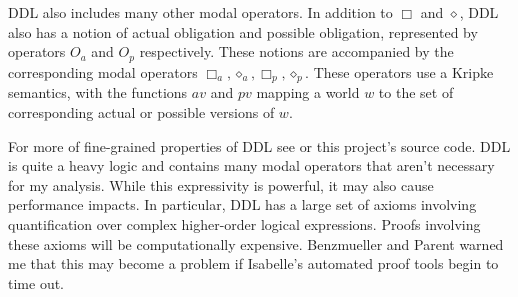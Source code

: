 \begin{isabellebody}
\begin{isamarkuptext}
DDL also includes many other modal operators. In addition to $\Box$ and $\diamond$, DDL also has a notion
of actual obligation and possible obligation, represented by operators $O_a$ and $O_p$ respectively. 
These notions are accompanied by the corresponding modal operators $\Box_a, \diamond_a, \Box_p, \diamond_p$. 
These operators use a Kripke semantics, with the functions $av$ and $pv$ mapping a world $w$ to the set 
of corresponding actual or possible versions of $w$. 

For more of fine-grained properties of DDL see \cite{CJDDL} or this project's source code. DDL is quite a heavy logic and contains many modal operators 
that aren't necessary for my analysis. While this expressivity is powerful, it may also cause performance
impacts. In particular, DDL has a large set of axioms involving quantification over complex higher-order
logical expressions. Proofs involving these axioms will be computationally expensive.  Benzmueller 
and Parent warned me that this may become a problem if Isabelle's automated proof tools begin to time out.%
\end{isamarkuptext}\isamarkuptrue%
%
\isadelimdocument
%
\endisadelimdocument
%
\isatagdocument
%
\endisatagdocument
{\isafolddocument}%
%
\isadelimdocument
%
\endisadelimdocument
%
\isadelimtheory
%
\endisadelimtheory
%
\isatagtheory
%
\endisatagtheory
{\isafoldtheory}%
%
\isadelimtheory
%
\endisadelimtheory
%
\end{isabellebody}%
\endinput
